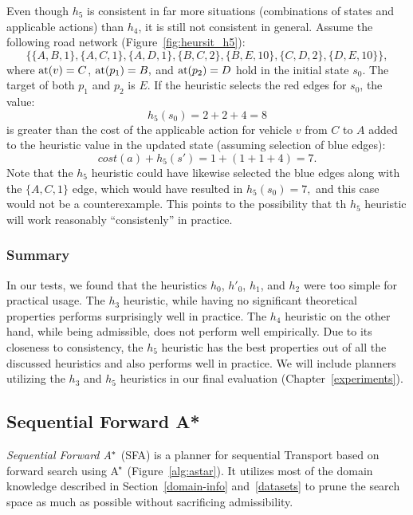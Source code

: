 Even though $h_5$ is consistent in far more situations (combinations of states and applicable actions) than $h_4$, it is still not consistent in general.
Assume the following road network (Figure~\ref{fig:heursit_h5}):
$$\{\{A, B, 1\}, \{A, C, 1\}, \{A, D, 1\}, \{B, C, 2\}, \{B, E, 10\}, \{C, D, 2\}, \{D, E, 10\}\},$$
where $\textrm{at}(v) = C$, $\textrm{at}(p_1) = B,$ and $\textrm{at}(p_2) = D$
hold in the initial state $s_0$.
The target of both $p_1$ and $p_2$ is $E$.
If the heuristic selects the red edges for $s_0$, the value:
$$h_5(s_0) = 2+2+4 = 8$$ is greater than the cost
of the applicable \drive{} action for vehicle $v$ from $C$ to $A$
added to the heuristic value in the updated state (assuming selection of blue edges):
$$cost(a) + h_5(s') = 1 + (1+1+4) = 7.$$
Note that the $h_5$ heuristic could have likewise selected the blue edges along
with the $\{A, C, 1\}$ edge, which would have resulted in $h_5(s_0) = 7,$
and this case would not be a counterexample. This points to the possibility that th $h_5$ heuristic will work reasonably ``consistenly'' in practice.

\subsubsection{Summary}

In our tests, we found that
the heuristics $h_0$, $h'_0$, $h_1$, and $h_2$
were too simple for practical usage.
The $h_3$ heuristic, while having no significant
theoretical properties performs surprisingly well in practice.
The $h_4$ heuristic on the other hand, while being admissible, does not
perform well empirically.
Due to its closeness to consistency, the $h_5$ heuristic has the best properties out of all the discussed heuristics and also
performs well in practice.
We will include planners utilizing the $h_3$ and $h_5$ heuristics
in our final evaluation (Chapter~\ref{experiments}).








\subsection{Sequential Forward A*}\label{sfa}

\textit{Sequential Forward A$^{\kern-.05em*}$} (SFA) is a planner for sequential Transport based on forward search using A$^{\kern-.15em*}$ (Figure~\ref{alg:astar}).
It utilizes most of the domain knowledge described
in Section~\ref{domain-info} and~\ref{datasets}
to prune the search space as much as possible
without sacrificing admissibility.

